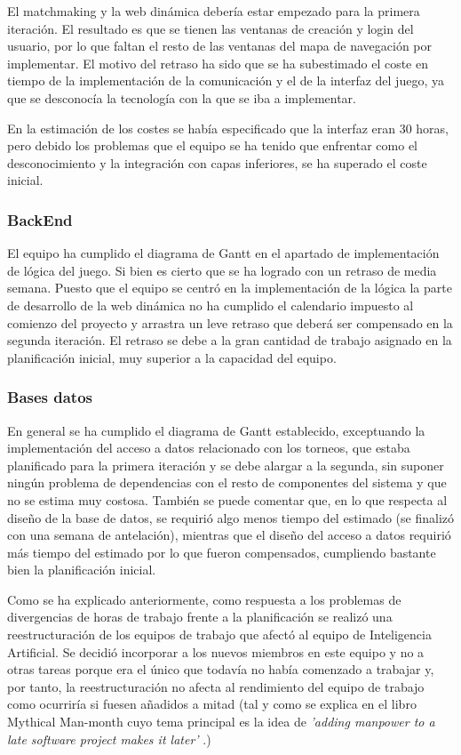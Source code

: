 El matchmaking y la web dinámica debería estar empezado para la primera iteración. El resultado es que se tienen las ventanas de creación y login del usuario, por lo que faltan el resto de las ventanas del mapa de navegación por implementar. El motivo del retraso ha sido que se ha subestimado el coste en tiempo de la implementación de la comunicación y el de la interfaz del juego, ya que se desconocía la tecnología con la que se iba a implementar.

En la estimación de los costes se había especificado que la interfaz eran 30 horas, pero debido los problemas que el equipo se ha tenido que enfrentar como el desconocimiento y la integración con capas inferiores, se ha superado el coste inicial.

\subsubsection*{BackEnd}
El equipo ha cumplido el diagrama de Gantt en el apartado de implementación de lógica del juego. Si bien es cierto que se ha logrado con un retraso de media semana. Puesto que el equipo se centró en la implementación de la lógica la parte de desarrollo de la web dinámica no ha cumplido el calendario impuesto al comienzo del proyecto y arrastra un leve retraso que deberá ser compensado en la segunda iteración. El retraso se debe a la gran cantidad de trabajo asignado en la planificación inicial, muy superior a la capacidad del equipo.

\subsubsection*{Bases datos}
En general se ha cumplido el diagrama de Gantt establecido, exceptuando la implementación del acceso a datos relacionado con los torneos, que estaba planificado para la primera iteración y se debe alargar a la segunda, sin suponer ningún problema de dependencias con el resto de componentes del sistema y que no se estima muy costosa. También se puede comentar que, en lo que respecta al diseño de la base de datos, se requirió algo menos tiempo del estimado (se finalizó con una semana de antelación), mientras que el diseño del acceso a datos requirió más tiempo del estimado por lo que fueron compensados, cumpliendo bastante bien la planificación inicial.

Como se ha explicado anteriormente, como respuesta a los problemas de divergencias de horas de trabajo frente a la planificación se realizó una reestructuración de los equipos de trabajo que afectó al equipo de Inteligencia Artificial. Se decidió incorporar a los nuevos miembros en este equipo y no a otras tareas porque era el único que todavía no había comenzado a trabajar y, por tanto, la reestructuración no afecta al rendimiento del equipo de trabajo como ocurriría si fuesen añadidos a mitad (tal y como se explica en el libro Mythical Man-month cuyo tema principal es la idea de \textit{'adding manpower to a late software project makes it later'} \cite{libroMMM}.)
